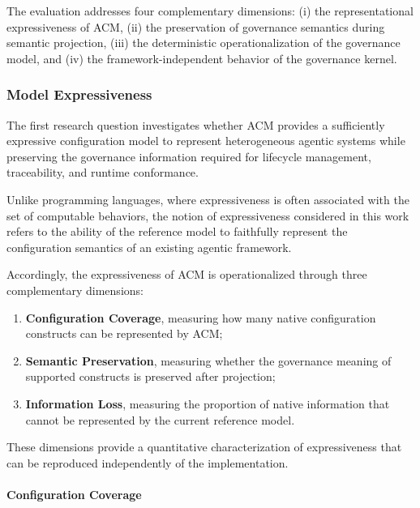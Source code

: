 \documentclass[10pt]{article}
\begin{document}
The evaluation addresses four complementary dimensions: (i) the representational expressiveness of ACM, (ii) the preservation of governance semantics during semantic projection, (iii) the deterministic operationalization of the governance model, and (iv) the framework-independent behavior of the governance kernel.

\subsubsection{Model Expressiveness}
\label{subsubsec:model_expressiveness}

The first research question investigates whether ACM provides a sufficiently
expressive configuration model to represent heterogeneous agentic systems while
preserving the governance information required for lifecycle management,
traceability, and runtime conformance.

Unlike programming languages, where expressiveness is often associated with the
set of computable behaviors, the notion of expressiveness considered in this
work refers to the ability of the reference model to faithfully represent the
configuration semantics of an existing agentic framework.

Accordingly, the expressiveness of ACM is operationalized through three
complementary dimensions:

\begin{enumerate}
    \item \textbf{Configuration Coverage}, measuring how many native
          configuration constructs can be represented by ACM;
    \item \textbf{Semantic Preservation}, measuring whether the governance
          meaning of supported constructs is preserved after projection;
    \item \textbf{Information Loss}, measuring the proportion of native
          information that cannot be represented by the current reference
          model.
\end{enumerate}

These dimensions provide a quantitative characterization of expressiveness that
can be reproduced independently of the implementation.

\paragraph{Configuration Coverage}
\end{document}
